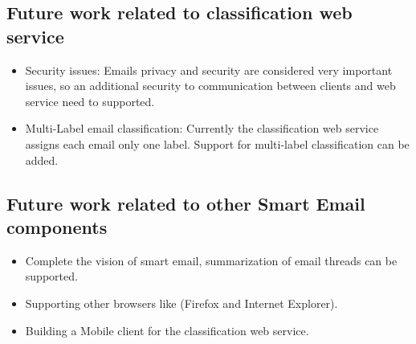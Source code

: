 \subsection{Future work related to classification web service}
\begin{itemize}
    \item Security issues: Emails privacy and security are considered very
    important issues, so an additional security to communication between clients and
    web service need to supported.
    \item Multi-Label email classification: Currently the classification web
    service assigns each email only one label. Support for multi-label
    classification can be added.
\end{itemize}

\subsection{Future work related to other Smart Email components}
\begin{itemize}
    \item Complete the vision of smart email,
        summarization of email threads can be supported.
    \item Supporting other browsers like (Firefox and Internet Explorer).
    \item Building a Mobile client for the classification web service.
\end{itemize}


